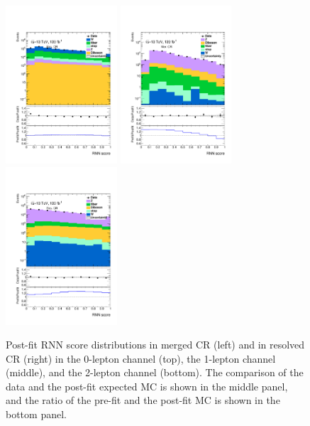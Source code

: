 \begin{figure}[ht]
    \includegraphics[width=0.37\textwidth]{figures/validation/Region_distRNN_DCRVjetTight_BMin0_T0_Y6051_incTag1_J2_L1_incJet1.pdf}
    \includegraphics[width=0.37\textwidth]{figures/validation/Region_distRNNScoreMerged_DCRVjet_BMin0_J0_incJet1_L2_T0_incFat1_Y6051_incTag1_Fat1.pdf}
    \includegraphics[width=0.37\textwidth]{figures/validation/Region_distRNNScoreResolved_DCRVjetFid_BMin0_T0_Y6051_incTag1_J2_L2_incJet1.pdf}
    \caption{Post-fit RNN score distributions in merged CR (left) and in resolved CR (right) in the 0-lepton channel (top), the 1-lepton channel (middle), and the 2-lepton channel (bottom). The comparison of the data and the post-fit expected MC is shown in the middle panel, and the ratio of the pre-fit and the post-fit MC is shown in the bottom panel.}
    \label{fig:postCheck}
\end{figure}

